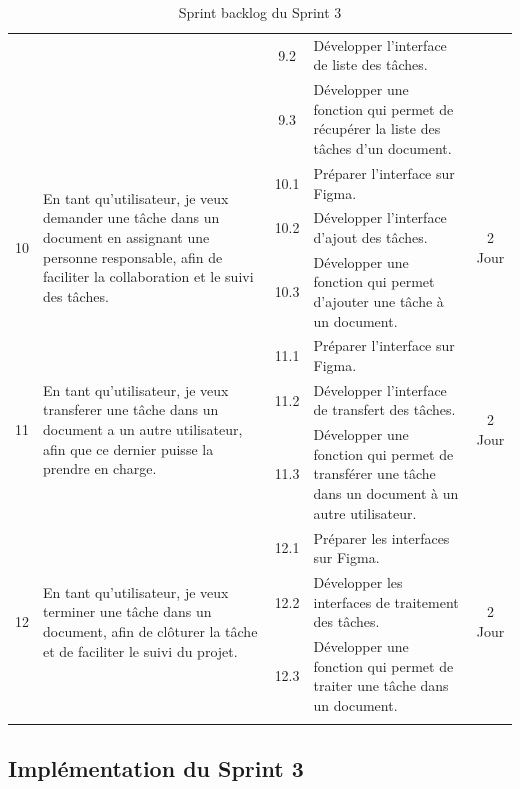 \begin{adjustwidth}{-1cm}{}
\begin{longtable}{|c|p{6cm}|c|p{6cm}|c|}
      \cline{3-4}
      & & 9.2 & Développer l'interface de liste des tâches. & \\
      \cline{3-4}
      & & 9.3 & Développer une fonction qui permet de récupérer la liste des tâches d'un document. & \\
      \cline{1-5}
      \multirow{3}{*}{10} & \multirow{3}{6cm}{En tant qu'utilisateur, je veux demander une tâche dans un document en assignant une personne responsable, afin de faciliter la collaboration et le suivi des tâches.} & 10.1 & Préparer l'interface sur Figma. & \multirow{3}{*}{2 Jour} \\
      \cline{3-4}
      & & 10.2 & Développer l'interface d'ajout des tâches. & \\
      \cline{3-4}
      & & 10.3 & Développer une fonction qui permet d'ajouter une tâche à un document. & \\
      \cline{1-5}
      \multirow{3}{*}{11} & \multirow{3}{6cm}{En tant qu'utilisateur, je veux transferer une tâche dans un document a un autre utilisateur, afin que ce dernier puisse la prendre en charge.} & 11.1 & Préparer l'interface sur Figma. & \multirow{3}{*}{2 Jour} \\
      \cline{3-4}
      & & 11.2 & Développer l'interface de transfert des tâches. & \\
      \cline{3-4}
      & & 11.3 & Développer une fonction qui permet de transférer une tâche dans un document à un autre utilisateur. & \\
      \cline{1-5}
      \multirow{3}{*}{12} &\multirow{3}{6cm}{En tant qu'utilisateur, je veux terminer une tâche dans un document, afin de clôturer la tâche et de faciliter le suivi du projet.} & 12.1 & Préparer les interfaces sur Figma. & \multirow{3}{*}{2 Jour} \\
      \cline{3-4}
      & & 12.2 & Développer les interfaces de traitement des tâches. & \\
      \cline{3-4}
      & & 12.3 & Développer une fonction qui permet de traiter une tâche dans un document. & \\
      \cline{1-5}
  \hline
  \caption{Sprint backlog du Sprint 3}
  \label{tab:sprint-backlog-3}
\end{longtable}
\end{adjustwidth}



\subsection{Implémentation du Sprint 3}


